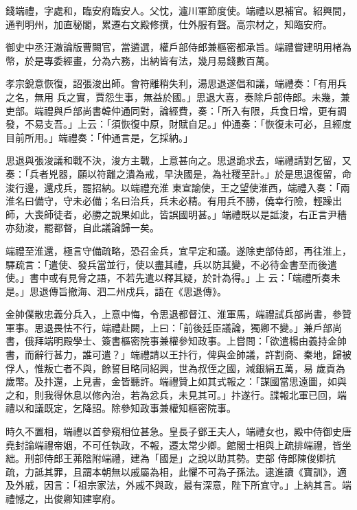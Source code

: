 \begin{pinyinscope}
 錢端禮，字處和，臨安府臨安人。父忱，瀘川軍節度使。端禮以恩補官。紹興間，通判明州，加直秘閣，累遷右文殿修撰，仕外服有聲。高宗材之，知臨安府。



 御史中丞汪澈論版曹闕官，當遴選，權戶部侍郎兼樞密都承旨。端禮嘗建明用楮為幣，於是專委經畫，分為六務，出納皆有法，幾月易錢數百萬。



 孝宗銳意恢復，詔張浚出師。會符離稍失利，湯思退遂倡和議，端禮奏：「有用兵之名，無用
 兵之實，賈怨生事，無益於國。」思退大喜，奏除戶部侍郎。未幾，兼吏部。端禮與戶部尚書韓仲通同對，論經費，奏：「所入有限，兵食日增，更有調發，不易支吾。」上云：「須恢復中原，財賦自足。」仲通奏：「恢復未可必，且經度目前所用。」端禮奏：「仲通言是，乞採納。」



 思退與張浚議和戰不決，浚方主戰，上意甚向之。思退詭求去，端禮請對乞留，又奏：「兵者兇器，願以符離之潰為戒，早決國是，為社稷至計。」於是思退復留，命浚行邊，還戍兵，罷招納。以端禮充淮
 東宣諭使，王之望使淮西，端禮入奏：「兩淮名曰備守，守未必備；名曰治兵，兵未必精。有用兵不勝，僥幸行險，輕躁出師，大喪師徒者，必勝之說果如此，皆誤國明甚。」端禮既以是詆浚，右正言尹穡亦劾浚，罷都督，自此議論歸一矣。



 端禮至淮還，極言守備疏略，恐召金兵，宜早定和議。遂除吏部侍郎，再往淮上，驛疏言：「遣使、發兵當並行，使以盡其禮，兵以防其變，不必待金書至而後遣使。」書中或有見脅之語，不若先遣以釋其疑，於計為得。」上
 云：「端禮所奏未是。」思退傳旨撤海、泗二州戍兵，語在《思退傳》。



 金帥僕散忠義分兵入，上意中悔，令思退都督江、淮軍馬，端禮試兵部尚書，參贊軍事。思退畏怯不行，端禮赴闕，上曰：「前後廷臣議論，獨卿不變。」兼戶部尚書，俄拜端明殿學士、簽書樞密院事兼權參知政事。上嘗問：「欲遣楊由義持金帥書，而辭行甚力，誰可遣？」端禮請以王抃行，俾與金帥議，許割商、秦地，歸被俘人，惟叛亡者不與，餘誓目略同紹興，世為叔侄之國，減銀絹五萬，易
 歲貢為歲幣。及抃還，上見書，金皆聽許。端禮贊上如其式報之：「謀國當思遠圖，如與之和，則我得休息以修內治，若為忿兵，未見其可。」抃遂行。諜報北軍已回，端禮以和議既定，乞降詔。除參知政事兼權知樞密院事。



 時久不置相，端禮以首參窺相位甚急。皇長子鄧王夫人，端禮女也，殿中侍御史唐堯封論端禮帝姻，不可任執政，不報，遷太常少卿。館閣士相與上疏排端禮，皆坐絀。刑部侍郎王茀陰附端禮，建為「國是」之說以助其勢。吏部
 侍郎陳俊卿抗疏，力詆其罪，且謂本朝無以戚屬為相，此懼不可為子孫法。逮進讀《寶訓》，適及外戚，因言：「祖宗家法，外戚不與政，最有深意，陛下所宜守。」上納其言。端禮憾之，出俊卿知建寧府。




\end{pinyinscope}
